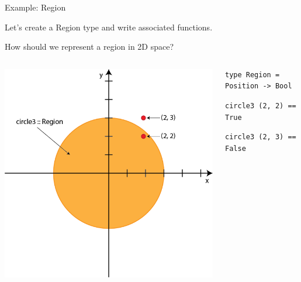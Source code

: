 \documentclass[8pt,aspectratio=169]{beamer}
\begin{document}
\begin{frame}[fragile]{Example: Region}

Let's create a Region type and write associated functions.

\pause
How should we represent a region in 2D space?

\begin{columns}[onlytextwidth]
\begin{column}{0.45\textwidth}

\pause
\begin{center}
\includegraphics[scale=0.3]{figures/region}
\end{center}

\end{column}
\begin{column}{0.55\textwidth}

\pause
\begin{verbatim}
type Region = Position -> Bool
\end{verbatim}

\pause
\begin{verbatim}
circle3 (2, 2) == True
\end{verbatim}

\pause
\begin{verbatim}
circle3 (2, 3) == False
\end{verbatim}


\end{column}
\end{columns}
\end{frame}
\end{document}
